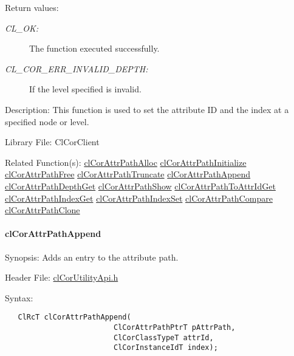 \begin{Desc}
\item[Return values:]
\begin{description}
\item[{\em CL\_\-OK:}]The function executed successfully. \item[{\em CL\_\-COR\_\-ERR\_\-INVALID\_\-DEPTH:}]If the level specified is invalid.\end{description}
\end{Desc}
\begin{Desc}
\item[Description:]This function is used to set the attribute ID and the index at a specified node or level.\end{Desc}
\begin{Desc}
\item[Library File:]Cl\-Cor\-Client\end{Desc}
\begin{Desc}
\item[Related Function(s):]\hyperlink{group__group13}{cl\-Cor\-Attr\-Path\-Alloc} \hyperlink{group__group13}{cl\-Cor\-Attr\-Path\-Initialize} \hyperlink{group__group13}{cl\-Cor\-Attr\-Path\-Free} \hyperlink{group__group13}{cl\-Cor\-Attr\-Path\-Truncate} \hyperlink{group__group13}{cl\-Cor\-Attr\-Path\-Append} \hyperlink{group__group13}{cl\-Cor\-Attr\-Path\-Depth\-Get} \hyperlink{group__group13}{cl\-Cor\-Attr\-Path\-Show} \hyperlink{group__group13}{cl\-Cor\-Attr\-Path\-To\-Attr\-Id\-Get} \hyperlink{group__group13}{cl\-Cor\-Attr\-Path\-Index\-Get} \hyperlink{group__group13}{cl\-Cor\-Attr\-Path\-Index\-Set} \hyperlink{group__group13}{cl\-Cor\-Attr\-Path\-Compare} \hyperlink{group__group13}{cl\-Cor\-Attr\-Path\-Clone} \end{Desc}
\hypertarget{pagecor260}{}\paragraph{cl\-Cor\-Attr\-Path\-Append}\label{pagecor260}
\begin{Desc}
\item[Synopsis:]Adds an entry to the attribute path.\end{Desc}
\begin{Desc}
\item[Header File:]\hyperlink{cl_cor_utility_api_8h}{cl\-Cor\-Utility\-Api.h}\end{Desc}
\begin{Desc}
\item[Syntax:]

\footnotesize\begin{verbatim}   ClRcT clCorAttrPathAppend(
                         ClCorAttrPathPtrT pAttrPath,
                         ClCorClassTypeT attrId,
                         ClCorInstanceIdT index);
\end{verbatim}
\normalsize
\end{Desc}
